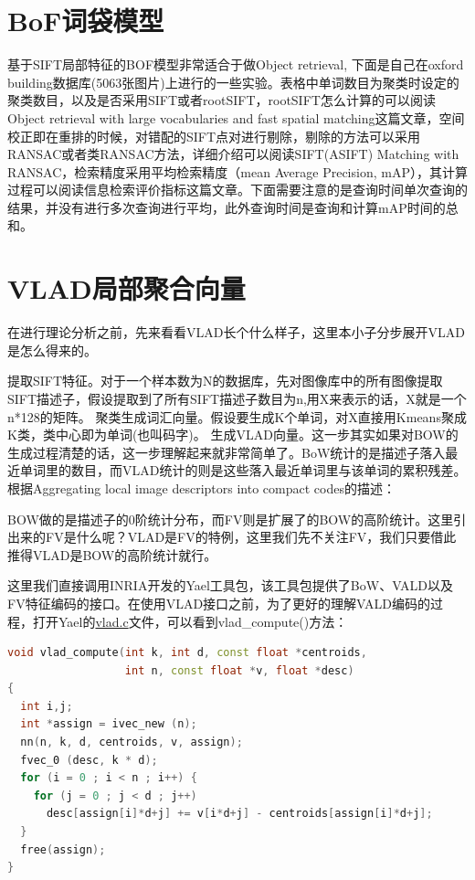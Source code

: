 \documentclass[color=cyan,mathpazo,titlestyle=hang]{elegantbook}
\begin{document}
\section{BoF词袋模型}

基于SIFT局部特征的BOF模型非常适合于做Object retrieval, 下面是自己在oxford building数据库(5063张图片)上进行的一些实验。表格中单词数目为聚类时设定的聚类数目，以及是否采用SIFT或者rootSIFT，rootSIFT怎么计算的可以阅读Object retrieval with large vocabularies and fast spatial matching这篇文章，空间校正即在重排的时候，对错配的SIFT点对进行剔除，剔除的方法可以采用RANSAC或者类RANSAC方法，详细介绍可以阅读SIFT(ASIFT) Matching with RANSAC，检索精度采用平均检索精度（mean Average Precision, mAP），其计算过程可以阅读信息检索评价指标这篇文章。下面需要注意的是查询时间单次查询的结果，并没有进行多次查询进行平均，此外查询时间是查询和计算mAP时间的总和。

\section{VLAD局部聚合向量}

在进行理论分析之前，先来看看VLAD长个什么样子，这里本小子分步展开VLAD是怎么得来的。

提取SIFT特征。对于一个样本数为N的数据库，先对图像库中的所有图像提取SIFT描述子，假设提取到了所有SIFT描述子数目为n,用X来表示的话，X就是一个n*128的矩阵。
聚类生成词汇向量。假设要生成K个单词，对X直接用Kmeans聚成K类，类中心即为单词(也叫码字)。
生成VLAD向量。这一步其实如果对BOW的生成过程清楚的话，这一步理解起来就非常简单了。BoW统计的是描述子落入最近单词里的数目，而VLAD统计的则是这些落入最近单词里与该单词的累积残差。根据Aggregating local image descriptors into compact codes的描述：

BOW做的是描述子的0阶统计分布，而FV则是扩展了的BOW的高阶统计。这里引出来的FV是什么呢？VLAD是FV的特例，这里我们先不关注FV，我们只要借此推得VLAD是BOW的高阶统计就行。

这里我们直接调用INRIA开发的Yael工具包，该工具包提供了BoW、VALD以及FV特征编码的接口。在使用VLAD接口之前，为了更好的理解VALD编码的过程，打开Yael的\href{https://github.com/jackculpepper/yael/blob/master/yael/vlad.c#L48}{vlad.c}文件，可以看到vlad\_compute()方法：

\begin{lstlisting}[language=c++]
void vlad_compute(int k, int d, const float *centroids, 
                  int n, const float *v, float *desc)  
{
  int i,j;
  int *assign = ivec_new (n);
  nn(n, k, d, centroids, v, assign);
  fvec_0 (desc, k * d);
  for (i = 0 ; i < n ; i++) {
    for (j = 0 ; j < d ; j++) 
      desc[assign[i]*d+j] += v[i*d+j] - centroids[assign[i]*d+j];
  }      
  free(assign);
}
\end{lstlisting}
\end{document}
